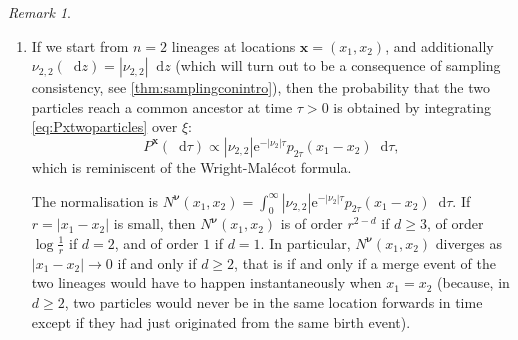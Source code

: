 \documentclass[reqno,draft]{amsart}
\numberwithin{equation}{section}
\theoremstyle{plain}
\theoremstyle{remark}
\newtheorem{remark}[theorem]{Remark}
\newtheorem{example}[theorem]{Example}
\newcommand*\diff{\mathop{}\!\mathrm{d}}
\newcommand{\e}{\mathrm{e}}
\newcommand{\nut}[1]{|\nu_{#1}|}
\begin{document}
\begin{remark}
\begin{enumerate}
The function $N^{\boldsymbol \nu}$ also reveals a technical reason why it was necessary to exclude some points from the state space $\mathcal{X}$: If $\boldsymbol x$ approaches a point in the boundary of $\mathcal{X}$, then $N^{\boldsymbol \nu}(\boldsymbol x)$ diverges if the transition measure associated with the coalescent event that would have to happen instantaneously is non-zero, see also \cref{rem:Ndivergence} and the following remark.
\item
    If we start from $n=2$ lineages at locations $\boldsymbol x = (x_1,x_2)$, and additionally
    $\nu_{2,2}(\diff z) = |\nu_{2,2}| \diff z$ (which will turn out to be a consequence of sampling consistency, see \cref{thm:samplingconintro}), then
    the probability that the two particles reach a common ancestor at time $\tau > 0$ is obtained by integrating \cref{eq:Pxtwoparticles} over $\xi$:
    \begin{equation}\label{eq:wmformula}
        P^{\boldsymbol x}(\diff \tau) 
        \propto
        |\nu_{2,2}| \e^{-\nut{2} \tau} p_{2\tau}(x_1-x_2) \diff \tau,
    \end{equation}
    which is reminiscent of the Wright-Mal\'ecot formula. 

    The normalisation is $N^{\boldsymbol \nu}(x_1,x_2) = \int_0^\infty  |\nu_{2,2}|\e^{-\nut{2} \tau} p_{2\tau}(x_1-x_2) \diff \tau$. If $r = |x_1-x_2|$ is small, then $N^{\boldsymbol \nu}(x_1,x_2)$ is of order $r^{2-d}$ if $d \ge 3$, of order $\log \frac{1}{r}$ if $d = 2$, and of order $1$ if $d = 1$. In particular, $N^{\boldsymbol \nu}(x_1,x_2)$ diverges as $|x_1-x_2| \to 0$ if and only if $d \ge 2$, that is if and only if a merge event of the two lineages would have to happen instantaneously when $x_1 = x_2$ (because, in $d \ge 2$, two particles would never be in the same location forwards in time except if they had just originated from the same birth event).
    \end{enumerate}
\end{remark}
\end{document}
